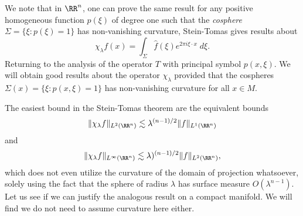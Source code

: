 We note that in $\RR^n$, one can prove the same result for any positive homogeneous function $p(\xi)$ of degree one such that the \emph{cosphere} $\Sigma = \{ \xi : p(\xi) = 1 \}$ has non-vanishing curvature, Stein-Tomas gives results about
%
\[ \chi_\lambda f(x) = \int_\Sigma \widehat{f}(\xi) e^{2 \pi i \xi \cdot x}\; d \xi. \]
%
Returning to the analysis of the operator $T$ with principal symbol $p(x,\xi)$. We will obtain good results about the operator $\chi_\lambda$ provided that the cospheres $\Sigma(x) = \{ \xi : p(x,\xi) = 1 \}$ has non-vanishing curvature for all $x \in M$.

The easiest bound in the Stein-Tomas theorem are the equivalent bounds
%
\[ \| \chi_\lambda f \|_{L^2(\RR^n)} \lesssim \lambda^{(n-1)/2} \| f \|_{L^1(\RR^n)} \]
%
and
%
\[ \| \chi_\lambda f \|_{L^\infty(\RR^n)} \lesssim \lambda)^{(n-1)/2} \| f \|_{L^2(\RR^n)}, \]
%
which does not even utilize the curvature of the domain of projection whatsoever, solely using the fact that the sphere of radius $\lambda$ has surface measure $O(\lambda^{n-1})$. Let us see if we can justify the analogous result on a compact manifold. We will find we do not need to assume curvature here either.

